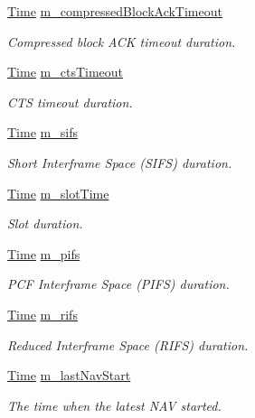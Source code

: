 \begin{DoxyCompactItemize}
\hyperlink{classns3_1_1Time}{Time} \hyperlink{classns3_1_1MacLow_af859368621713602f22944a1a00f9aab}{m\+\_\+compressed\+Block\+Ack\+Timeout}
\begin{DoxyCompactList}\small\item\em Compressed block A\+CK timeout duration. \end{DoxyCompactList}\item 
\hyperlink{classns3_1_1Time}{Time} \hyperlink{classns3_1_1MacLow_ab6dd76e9ab50582171a60074ff759b51}{m\+\_\+cts\+Timeout}
\begin{DoxyCompactList}\small\item\em C\+TS timeout duration. \end{DoxyCompactList}\item 
\hyperlink{classns3_1_1Time}{Time} \hyperlink{classns3_1_1MacLow_ad8abf26b1e85563b8e9b2cfd1849226c}{m\+\_\+sifs}
\begin{DoxyCompactList}\small\item\em Short Interframe Space (S\+I\+FS) duration. \end{DoxyCompactList}\item 
\hyperlink{classns3_1_1Time}{Time} \hyperlink{classns3_1_1MacLow_a76eff59c8a4983b9830edf3c6ef5e76e}{m\+\_\+slot\+Time}
\begin{DoxyCompactList}\small\item\em Slot duration. \end{DoxyCompactList}\item 
\hyperlink{classns3_1_1Time}{Time} \hyperlink{classns3_1_1MacLow_a115cd42f0f4a32f94c7cf80f3ad8efe9}{m\+\_\+pifs}
\begin{DoxyCompactList}\small\item\em P\+CF Interframe Space (P\+I\+FS) duration. \end{DoxyCompactList}\item 
\hyperlink{classns3_1_1Time}{Time} \hyperlink{classns3_1_1MacLow_afb4a9a2b443271b3dab4091c3e7190c7}{m\+\_\+rifs}
\begin{DoxyCompactList}\small\item\em Reduced Interframe Space (R\+I\+FS) duration. \end{DoxyCompactList}\item 
\hyperlink{classns3_1_1Time}{Time} \hyperlink{classns3_1_1MacLow_ad306264b6f7c07d8b222d461f2d09b29}{m\+\_\+last\+Nav\+Start}
\begin{DoxyCompactList}\small\item\em The time when the latest N\+AV started. \end{DoxyCompactList}\item 

\end{DoxyCompactItemize}
